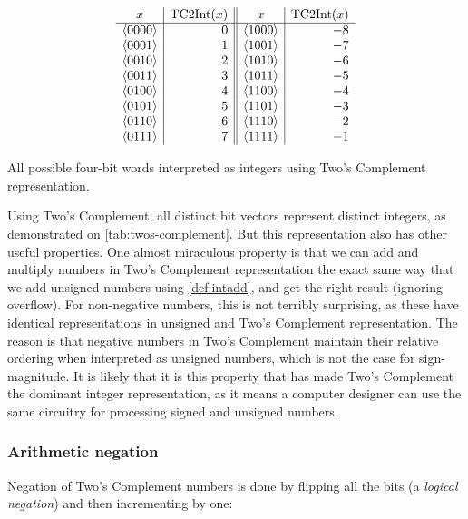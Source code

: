\begin{table}
  \centering
  \[
  \begin{array}{c|r||c|r}
    x & \mathrm{TC2Int}(x) & x & \mathrm{TC2Int}(x) \\\hline
    \langle 0000 \rangle & 0 & \langle 1000 \rangle & -8 \\
    \langle 0001 \rangle & 1 & \langle 1001 \rangle & -7 \\
    \langle 0010 \rangle & 2 & \langle 1010 \rangle & -6 \\
    \langle 0011 \rangle & 3 & \langle 1011 \rangle & -5 \\
    \langle 0100 \rangle & 4 & \langle 1100 \rangle & -4 \\
    \langle 0101 \rangle & 5 & \langle 1101 \rangle & -3 \\
    \langle 0110 \rangle & 6 & \langle 1110 \rangle & -2 \\
    \langle 0111 \rangle & 7 & \langle 1111 \rangle & -1 \\
  \end{array}
  \]
  \caption{All possible four-bit words interpreted as integers using
    Two's Complement representation.}
  \label{tab:twos-complement}
\end{table}

Using Two's Complement, all distinct bit vectors represent distinct
integers, as demonstrated on \cref{tab:twos-complement}.  But this
representation also has other useful properties.  One almost
miraculous property is that we can add and multiply numbers in Two's
Complement representation the exact same way that we add unsigned
numbers using \cref{def:intadd}, and get the right result (ignoring
overflow).  For non-negative numbers, this is not terribly surprising,
as these have identical representations in unsigned and Two's
Complement representation.  The reason is that negative numbers in
Two's Complement maintain their relative ordering when interpreted as
unsigned numbers, which is not the case for sign-magnitude.  It is
likely that it is this property that has made Two's Complement the
dominant integer representation, as it means a computer designer can
use the same circuitry for processing signed and unsigned numbers.

\subsubsection{Arithmetic negation}

Negation of Two's Complement numbers is done by flipping all the bits
(a \emph{logical negation}) and then incrementing by one:

